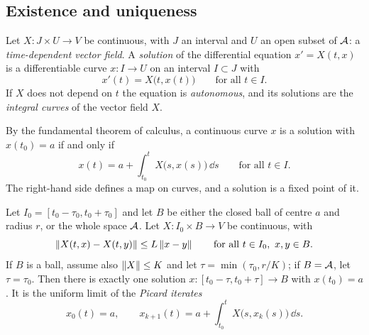 \begin{notechapter}
\section{Existence and uniqueness}\label{odes-flows:sec:existence}

\begin{definition}[Solution]\label{odes-flows:def:solution}
Let $X:J\times U\to V$ be continuous, with $J$ an interval and $U$ an
open subset of $\mathcal{A}$: a \emph{time-dependent vector field}. A
\emph{solution} of the differential equation $x' = X(t, x)$ is a
differentiable curve $x:I\to U$ on an interval $I\subset J$ with
\[
  x'(t) = X\bigl(t, x(t)\bigr)\qquad\text{for all }t\in I .
\]
If $X$ does not depend on $t$ the equation is \emph{autonomous}, and
its solutions are the \emph{integral curves} of the vector field $X$.
\end{definition}

By the fundamental theorem of calculus, a continuous curve $x$ is a
solution with $x(t_0) = a$ if and only if
\begin{equation}\label{odes-flows:eq:integral}
  x(t) = a + \int_{t_0}^tX\bigl(s, x(s)\bigr)\,\dd s
  \qquad\text{for all }t\in I .
\end{equation}
The right-hand side defines a map on curves, and a solution is a fixed
point of it.

\begin{theorem}\label{odes-flows:thm:picard}
Let $I_0 = [t_0 - \tau_0, t_0 + \tau_0]$ and let $B$ be either the
closed ball of centre $a$ and radius $r$, or the whole space $\mathcal{A}$.
Let $X:I_0\times B\to V$ be continuous, with
\[
  \left\|X(t, x) - X(t, y)\right\|\leq L\left\|x - y\right\|
  \qquad\text{for all }t\in I_0,\ x, y\in B .
\]
If $B$ is a ball, assume also $\left\|X\right\|\leq K$ and let
$\tau = \min(\tau_0, r/K)$; if $B = \mathcal{A}$, let $\tau = \tau_0$. Then
there is exactly one solution $x:[t_0 - \tau, t_0 + \tau]\to B$ with
$x(t_0) = a$. It is the uniform limit of the \emph{Picard iterates}
\[
  x_0(t) = a , \qquad
  x_{k+1}(t) = a + \int_{t_0}^tX\bigl(s, x_k(s)\bigr)\,\dd s .
\]
\end{theorem}


\end{notechapter}
